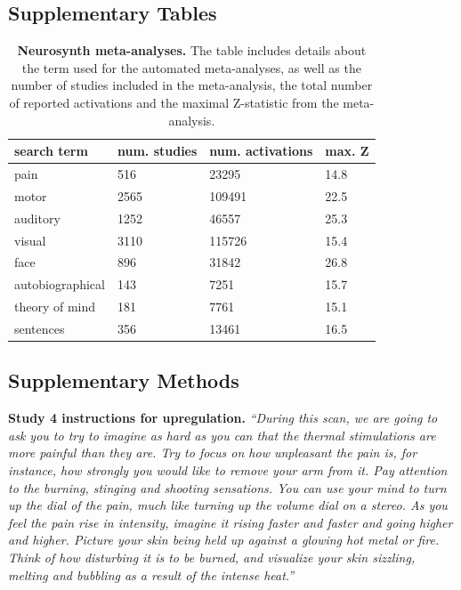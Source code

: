\documentclass{article}
\begin{document}
\subsection{Supplementary Tables}

\begin{table}
\centering
\caption[]{\textbf{Neurosynth meta-analyses.} The table includes details about the term used for the automated meta-analyses, as well as the number of studies included in the meta-analysis, the total number of reported activations and the maximal Z-statistic from the meta-analysis.}
\label{si-tab-neurosynth}
\begin{tabular}{p{}p{}p{}p{}}
\toprule
search term & num. studies & num. activations & max. Z \\
\hline
pain & 516 & 23295 & 14.8 \\
motor & 2565 & 109491 & 22.5 \\
auditory & 1252 & 46557 & 25.3 \\
visual & 3110 & 115726 & 15.4 \\
face & 896 & 31842 & 26.8 \\
autobiographical & 143 & 7251 & 15.7 \\
theory of mind & 181 & 7761 & 15.1 \\
sentences & 356 & 13461 & 16.5 \\
\bottomrule
\end{tabular}
\end{table}

\subsection{Supplementary Methods}

\textbf{Study 4 instructions for upregulation.}
\textit{``During this scan, we are going to ask you to try to imagine as hard as you can that the thermal stimulations are more painful than they are. Try to focus on how unpleasant the pain is, for instance, how strongly you would like to remove your arm from it. Pay attention to the burning, stinging and shooting sensations. You can use your mind to turn up the dial of the pain, much like turning up the volume dial on a stereo. As you feel the pain rise in intensity, imagine it rising faster and faster and going higher and higher. Picture your skin being held up against a glowing hot metal or fire. Think of how disturbing it is to be burned, and visualize your skin sizzling, melting and bubbling as a result of the intense heat.''}
\end{document}
